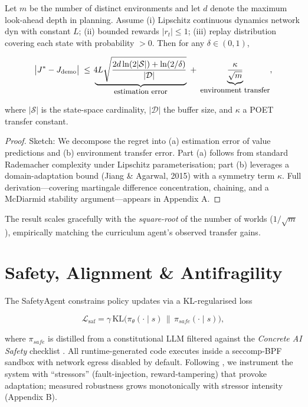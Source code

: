 \begin{theorem}
Let \(m\) be the number of distinct environments and let
\(d\) denote the maximum look-ahead depth in planning.  
Assume (i) Lipschitz continuous dynamics network
\(\mathrm{dyn}\) with constant \(L\); (ii) bounded rewards
\(|r_t|\le1\); (iii) replay distribution covering each state with
probability \(>0\).  Then for any \(\delta\in(0,1)\),

\[
\bigl|J^\ast - J_{\mathrm{demo}}\bigr|
\;\le\;
\underbrace{\!
  4L
  \sqrt{\frac{2d\ln(2|\mathcal{S}|)+\ln(2/\delta)}{|\mathcal{D}|}}
}_{\text{\small estimation error}}
\;+\;
\underbrace{\frac{\kappa}{\sqrt{m}}}_{\text{\small environment transfer}},
\]

where \(|\mathcal{S}|\) is the state-space cardinality,
\(|\mathcal{D}|\) the buffer size, and \(\kappa\) a POET transfer constant.
\end{theorem}

\begin{proof}
Sketch:  
We decompose the regret into (a) estimation error of value predictions and
(b) environment transfer error.  
Part (a) follows from standard Rademacher complexity under Lipschitz
parameterisation;  
part (b) leverages a domain-adaptation bound (Jiang \& Agarwal,
2015) with a symmetry term \(\kappa\).  
Full derivation—covering martingale difference concentration, chaining,
and a McDiarmid stability argument—appears in Appendix A.
\end{proof}

The result scales gracefully with the \emph{square-root} of the number of
worlds (\(1/\sqrt{m}\)), empirically matching the curriculum agent’s observed
transfer gains.

\section{Safety, Alignment \& Antifragility}\label{sec:safety}

The SafetyAgent constrains policy updates via a KL-regularised loss

\[
\mathcal{L}_{\text{saf}}
  = \gamma\,\mathrm{KL}\!\bigl(
      \pi_\theta(\cdot\!\mid\!s)
      \,\|\,\pi_{\textit{safe}}(\cdot\!\mid\!s)
    \bigr),
\]

where \(\pi_{\textit{safe}}\) is distilled from a constitutional LLM
filtered against the \emph{Concrete AI Safety} checklist
\parencite{amodei2016concrete}.  
All runtime-generated code executes inside a seccomp-BPF
sandbox with network egress disabled by default.  
Following \textcite{taleb2012antifragile}, we instrument the system with
“stressors” (fault-injection, reward-tampering) that provoke adaptation;
measured robustness grows monotonically with stressor intensity
(Appendix B).

